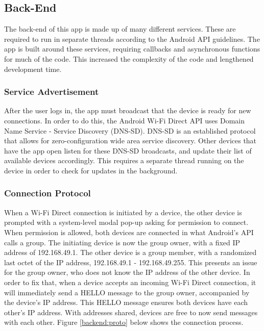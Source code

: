 \documentclass[10pt]{article}
\begin{document}
\subsection{Back-End}

The back-end of this app is made up of many different services. These are required to run in separate threads according to the Android API guidelines. The app is built around these services, requiring callbacks and asynchronous functions for much of the code. This increased the complexity of the code and lengthened development time.

\subsubsection{Service Advertisement}

After the user logs in, the app must broadcast that the device is ready for new connections. In order to do this, the Android Wi-Fi Direct API uses Domain Name Service - Service Discovery (DNS-SD). DNS-SD is an established protocol that allows for zero-configuration wide area service discovery. Other devices that have the app open listen for these DNS-SD broadcasts, and update their list of available devices accordingly. This requires a separate thread running on the device in order to check for updates in the background.

\subsubsection{Connection Protocol}

When a Wi-Fi Direct connection is initiated by a device, the other device is prompted with a system-level modal pop-up asking for permission to connect. When permission is allowed, both devices are connected in what Android's API calls a group. The initiating device is now the group owner, with a fixed IP address of 192.168.49.1. The other device is a group member, with a randomized last octet of the IP address, 192.168.49.1 - 192.168.49.255. This presents an issue for the group owner, who does not know the IP address of the other device. In order to fix that, when a device accepts an incoming Wi-Fi Direct connection, it will immediately send a HELLO message to the group owner, accompanied by the device's IP address. This HELLO message ensures both devices have each other's IP address. With addresses shared, devices are free to now send messages with each other. Figure \ref{backend:proto} below shows the connection process.
\end{document}
